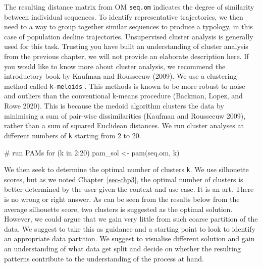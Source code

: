 \documentclass[
  letterpaper,
  DIV=11,
  numbers=noendperiod]{scrreprt}
\newenvironment{Shaded}{\begin{snugshade}}{\end{snugshade}}
\newcommand{\CommentTok}[1]{\textcolor[rgb]{0.37,0.37,0.37}{#1}}
\newcommand{\ControlFlowTok}[1]{\textcolor[rgb]{0.00,0.23,0.31}{#1}}
\newcommand{\DecValTok}[1]{\textcolor[rgb]{0.68,0.00,0.00}{#1}}
\newcommand{\FunctionTok}[1]{\textcolor[rgb]{0.28,0.35,0.67}{#1}}
\newcommand{\NormalTok}[1]{\textcolor[rgb]{0.00,0.23,0.31}{#1}}
\newcommand{\OtherTok}[1]{\textcolor[rgb]{0.00,0.23,0.31}{#1}}
\newcommand{\SpecialCharTok}[1]{\textcolor[rgb]{0.37,0.37,0.37}{#1}}
\begin{document}
The resulting distance matrix from OM \texttt{seq.om} indicates the
degree of similarity between individual sequences. To identify
representative trajectories, we then need to a way to group together
similar sequences to produce a typology, in this case of population
decline trajectories. Unsupervised cluster analysis is generally used
for this task. Trusting you have built an understanding of cluster
analysis from the previous chapter, we will not provide an elaborate
description here. If you would like to know more about cluster analysis,
we recommend the introductory book by Kaufman and Rousseeuw (2009). We
use a clustering method called \texttt{k-meloids} . This methods is
known to be more robust to noise and outliers than the conventional
k-means procedure (Backman, Lopez, and Rowe 2020). This is because the
medoid algorithm clusters the data by minimising a sum of pair-wise
dissimilarities (Kaufman and Rousseeuw 2009), rather than a sum of
squared Euclidean distances. We run cluster analyses at different
numbers of \texttt{k} starting from 2 to 20.

\begin{Shaded}
\begin{Highlighting}[]
\CommentTok{\# run PAMs}
\ControlFlowTok{for}\NormalTok{ (k }\ControlFlowTok{in} \DecValTok{2}\SpecialCharTok{:}\DecValTok{20}\NormalTok{)}
\NormalTok{  pam\_sol }\OtherTok{\textless{}{-}} \FunctionTok{pam}\NormalTok{(seq.om, k)}
\end{Highlighting}
\end{Shaded}

We then seek to determine the optimal number of clusters \texttt{k}. We
use silhouette scores, but as we noted Chapter~\ref{sec-chp3}, the
optimal number of clusters is better determined by the user given the
context and use case. It is an art. There is no wrong or right answer.
As can be seen from the results below from the average silhouette score,
two clusters is suggested as the optimal solution. However, we could
argue that we gain very little from such coarse partition of the data.
We suggest to take this as guidance and a starting point to look to
identify an appropriate data partition. We suggest to visualise
different solution and gain an understanding of what data get split and
decide on whether the resulting patterns contribute to the understanding
of the process at hand.
\end{document}
